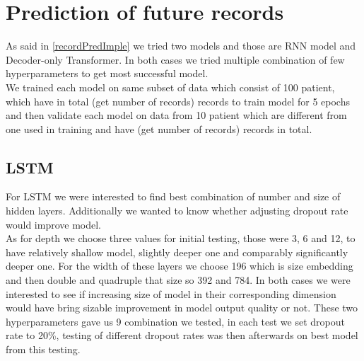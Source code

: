 
\section{Prediction of future records}
\label{recordPredRes}

As said in \ref{recordPredImple} we tried two models and those are RNN model and Decoder-only Transformer. In both cases we tried multiple combination of few hyperparameters to get most successful model. 
\\

We trained each model on same subset of data which consist of 100 patient, which have in total (get number of records) records to train model for 5 epochs and then validate each model on data from 10 patient which are different from one used in training and have (get number of records) records in total.  

\subsection{LSTM}

For LSTM we were interested to find best combination of number and size of hidden layers. Additionally we wanted to know whether adjusting dropout rate would improve model.
\\

As for depth we choose three values for initial testing, those were 3, 6 and 12, to have relatively shallow model, slightly deeper one and comparably significantly deeper one. For the width of these layers we choose 196 which is size embedding and then double and quadruple that size so 392 and 784. In both cases we were interested to see if increasing size of model in their corresponding dimension would have bring sizable improvement in model output quality or not. These two hyperparameters gave us 9 combination we tested, in each test we set dropout rate to 20\%, testing of different dropout rates was then afterwards on best model from this testing. 

